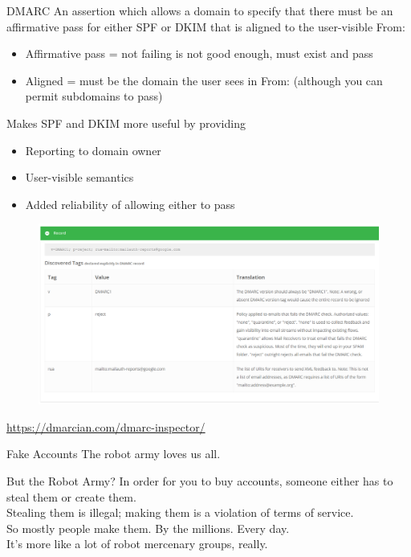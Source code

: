 \documentclass[nobackground,dvipsnames,table]{beamer}
\begin{document}
\begin{frame}{DMARC}
    An assertion which allows a domain to specify that there must be an affirmative pass for either SPF or DKIM that is aligned to the user-visible From:
    \begin{itemize}
        \item Affirmative pass = not failing is not good enough, must exist and pass
        \item Aligned = must be the domain the user sees in From: (although you can permit subdomains to pass)
    \end{itemize}
    Makes SPF and DKIM more useful by providing
    \begin{itemize}
        \item Reporting to domain owner
        \item User-visible semantics
        \item Added reliability of allowing either to pass
    \end{itemize}
\end{frame}

\begin{frame}{}
    \thispagestyle{empty}
    \begin{figure}
        \centering
        \includegraphics[width=\textwidth]{dmarc-discovered}
    \end{figure}
    \url{https://dmarcian.com/dmarc-inspector/}
\end{frame}

\begin{frame}{Fake Accounts}
    The robot army loves us all.
\end{frame}

\begin{frame}{But the Robot Army?}
    In order for you to buy accounts, someone either has to steal them or create them.\\
    Stealing them is illegal; making them is a violation of terms of service.\\
    So mostly people make them. By the millions. Every day.\\
    It’s more like a lot of robot mercenary groups, really. 
\end{frame}
\end{document}

